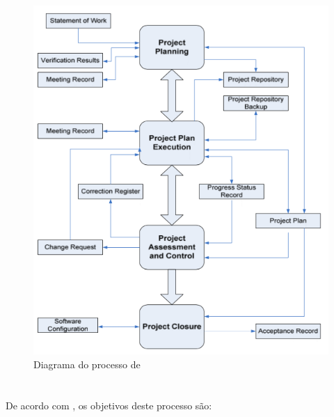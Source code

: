 \begin{figure}[!h]
\centering
\includegraphics[scale=0.5]{figuras/gp_diagr.png}
\caption{Diagrama do processo de \gp \cite[pág. 12]{iso}}
\label{fig:gp:diagr}
\end{figure}

\section{\dsw}

De acordo com \cite{iso}, os objetivos deste processo são:

